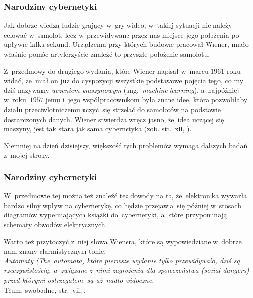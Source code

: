 \documentclass[10pt,t]{beamer}
\begin{document}
\begin{frame}
  \frametitle{Narodziny cybernetyki}


  Jak dobrze wiedzą ludzie grający w~gry wideo, w~takiej sytuacji nie
  należy celować w~samolot, lecz w~przewidywane przez nas miejsce jego
  położenia po upływie kilku sekund. Urządzenia przy których budowie
  pracował Wiener, miało właśnie pomóc artylerzyście znaleźć to przyszłe
  położenie samolotu.

  Z~przedmowy do drugiego wydania, które Wiener napisał w~marcu $1961$ roku
  widać, że~miał on już do dyspozycji wszystkie podstawowe pojęcia tego,
  co my dziś nazywamy \textit{uczeniem maszynowym} (ang.~\textit{machine
    learning}), a~najpóźniej w~roku~$1957$ jemu i~jego współpracownikom
  była znane idee, która pozwoliłaby działu przeciwlotniczemu uczyć~się
  strzelać do samolotów na podstawie dostarczonych danych. Wiener stwierdza
  wręcz jasno, że~idea uczącej się maszyny, jest tak stara jak sama
  cybernetyka (zob. str.~xii,
  \parencite{Wiener-Cybernetics-Second-edition-Pub-2016}).

  Niemniej na dzień dzisiejszy, większość tych problemów wymaga dalszych
  badań z~mojej strony.

\end{frame}





\begin{frame}
  \frametitle{Narodziny cybernetyki}


  W~przedmowie tej można też znaleźć też dowody na to, że~elektronika
  wywarła bardzo silny wpływ na cybernetykę, co będzie przejawia~się
  później w~stosach diagramów wypełniających książki do~cybernetyki,
  a~które przypominają schematy obwodów elektrycznych.

  Warto też przytoczyć z~niej słowa Wienera, które są wypowiedziane
  w~dobrze nam znany alarmistycznym tonie. \\
  \textit{Automaty (\textit{The~automata}) które pierwsze wydanie tylko
    przewidywało, dziś są rzeczywistością, a~związane z~nimi zagrożenia dla
    społeczeństwa (\textit{social dangers}) przed którymi ostrzegałem, są
    aż~nadto widoczne.} \\
  Tłum. swobodne, str.~vii,
  \parencite{Wiener-Cybernetics-Second-edition-Pub-2016}.

\end{frame}
\end{document}
